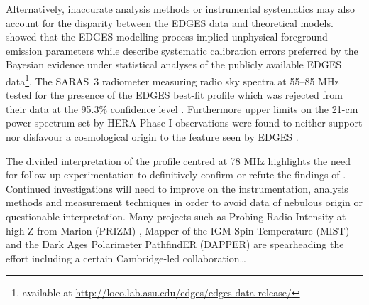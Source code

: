 Alternatively, inaccurate analysis methods or instrumental systematics may also account for the disparity between the EDGES data and theoretical models. \citet{hills_concerns} showed that the EDGES modelling process implied unphysical foreground emission parameters while \citet{sims_concerns} describe systematic calibration errors preferred by the Bayesian evidence under statistical analyses of the publicly available EDGES data\footnote{available at \url{http://loco.lab.asu.edu/edges/edges-data-release/}}. The \mbox{SARAS 3} radiometer measuring radio sky spectra at 55--85 MHz tested for the presence of the EDGES best-fit profile which was rejected from their data at the 95.3\% confidence level \citep{saras_reject}. Furthermore upper limits on the 21-cm power spectrum set by HERA Phase I observations were found to neither support nor disfavour a cosmological origin to the feature seen by EDGES \citep{hera_limits}.


The divided interpretation of the profile centred at 78 MHz highlights the need for follow-up experimentation to definitively confirm or refute the findings of \citet{edgesNature}. Continued investigations will need to improve on the instrumentation, analysis methods and measurement techniques in order to avoid data of nebulous origin or questionable interpretation. Many projects such as Probing Radio Intensity at high-Z from Marion (PRIZM) \citep{prizm}, Mapper of the IGM Spin Temperature (MIST) \citep{mist} and the Dark Ages Polarimeter PathfindER (DAPPER) \citep{dapper} are spearheading the effort including a certain Cambridge-led collaboration…


